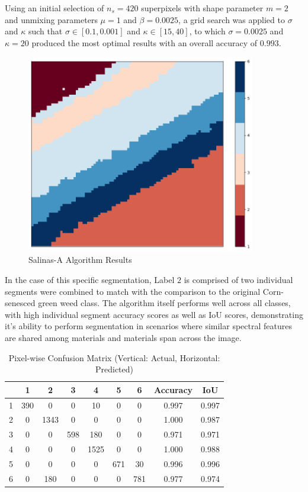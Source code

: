 \clearpage

Using an initial selection of $n_s = 420$ superpixels with shape parameter $m=2$ and unmixing parameters $\mu = 1$ and $\beta = 0.0025$, a grid search was applied to $\sigma$ and $\kappa$ such that $\sigma \in [0.1, 0.001]$ and $\kappa \in [15, 40]$, to which $\sigma = 0.0025$ and $\kappa = 20$ produced the most optimal results with an overall accuracy of $0.993$.
\begin{figure}[H]
    \centering
    \includegraphics[width=10cm]{salinas-a-labelled.png}  %
    \caption{Salinas-A Algorithm Results}
    \label{salina-a-results}  %
\end{figure}
In the case of this specific segmentation, Label $2$ is comprised of two individual segments were combined to match with the comparison to the original Corn-senesced green weed class. The algorithm itself performs well across all classes, with high individual segment accuracy scores as well as IoU scores, demonstrating it's ability to perform segmentation in scenarios where similar spectral features are shared among materials and materials span across the image.
\begin{table}[H]
    \centering
    \label{tab:salinas_cfm}
    \begin{tabular}{|c|cccccc|c|c|}
        \hline
         & \textbf{1} & \textbf{2} & \textbf{3} & \textbf{4} & \textbf{5} & \textbf{6} & \textbf{Accuracy} & \textbf{IoU} \\ \hline
        1      &  390    &  0    &  0    &  10    &  0    &  0    &  0.997 & 0.997  \\ 
        2      &  0    & 1343  &  0    &  0    &  0    &  0     &  1.000   & 0.987\\ 
        3      &  0    &  0    &  598  &  180   &  0    &  0    &  0.971  & 0.971\\ 
        4      &  0    &  0    &  0    & 1525  &  0    &  0    &  1.000  & 0.988\\ 
        5      &  0    &  0    &  0    &  0    &  671  &  30    &  0.996  & 0.996\\ 
        6      &  0    &  180   &  0    &  0    &  0    &  781  &  0.977  & 0.974\\ \hline
    \end{tabular}
    \caption{Pixel-wise Confusion Matrix (Vertical: Actual, Horizontal: Predicted)}
\end{table}

